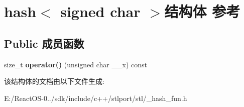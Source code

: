 \hypertarget{structhash_3_01signed_01char_01_4}{}\section{hash$<$ signed char $>$结构体 参考}
\label{structhash_3_01signed_01char_01_4}
\subsection*{Public 成员函数}
\begin{DoxyCompactItemize}
\item 
\mbox{\label{structhash_3_01signed_01char_01_4_a6c11c54606057cbb3ad3f9648f3fb98e}} 
size\+\_\+t {\bfseries operator()} (unsigned char \+\_\+\+\_\+x) const
\end{DoxyCompactItemize}


该结构体的文档由以下文件生成\+:\begin{DoxyCompactItemize}
\item 
E\+:/\+React\+O\+S-\/0../sdk/include/c++/stlport/stl/\+\_\+hash\+\_\+fun.\+h\end{DoxyCompactItemize}
